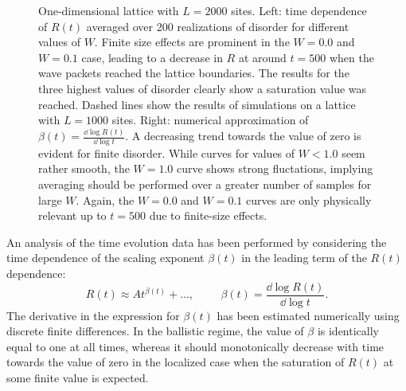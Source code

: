 \documentclass[10pt,a4paper]{article}
\begin{document}
\begin{figure}[H]
\caption{One-dimensional lattice with $L=2000$ sites. Left: time dependence of $R(t)$ averaged over 200 realizations of disorder for different values of $W$. Finite size effects are prominent in the $W=0.0$ and $W=0.1$ case, leading to a decrease in $R$ at around $t=500$ when the wave packets reached the lattice boundaries. The results for the three highest values of disorder clearly show a saturation value was reached. Dashed lines show the results of simulations on a lattice with $L=1000$ sites. Right: numerical approximation of $\beta(t)=\frac{\dd \log R(t)}{\dd \log t}$. A decreasing trend towards the value of zero is evident for finite disorder.  While curves for values of $W<1.0$ seem rather smooth, the $W=1.0$ curve shows strong fluctations, implying averaging should be performed over a greater number of samples for large $W$. Again, the $W=0.0$ and $W=0.1$ curves are only physically relevant up to $t=500$ due to finite-size effects. }
\label{fig:1D_rsq} 
\end{figure}
\noindent An analysis of the time evolution data has been performed by considering the time dependence of the scaling exponent $\beta(t)$ in the leading term of the $R(t)$ dependence:
\begin{equation}\label{eq:beta_time}
R(t)\approx At^{\beta(t)}+\dots, \hspace{1cm} \beta(t)=\frac{\dd \log R(t)}{\dd \log t}.
\end{equation}
The derivative in the expression for $\beta(t)$ has been estimated numerically using discrete finite differences. In the ballistic regime, the value of $\beta$ is identically equal to one at all times, whereas it should monotonically decrease with time towards the value of zero in the localized case when the saturation of $R(t)$ at some finite value is expected.  
\end{document}
